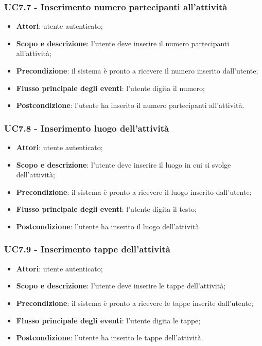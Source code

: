 \subsubsection{UC7.7 - Inserimento numero partecipanti all’attività}
\begin{itemize}
	\item \textbf{Attori}: utente autenticato;
	\item \textbf{Scopo e descrizione}: l’utente deve inserire il numero partecipanti all'attività;
	\item \textbf{Precondizione}: il sistema è pronto a ricevere il numero inserito dall’utente;
	\item \textbf{Flusso principale degli eventi}: l’utente digita il numero;
	\item \textbf{Postcondizione}: l’utente ha inserito il numero partecipanti all’attività.
\end{itemize}
\subsubsection{UC7.8 - Inserimento luogo dell’attività }
\begin{itemize}
	\item \textbf{Attori}: utente autenticato;
	\item \textbf{Scopo e descrizione}: l’utente deve inserire il luogo in cui si svolge dell'attività;
	\item \textbf{Precondizione}: il sistema è pronto a ricevere il luogo inserito dall’utente;
	\item \textbf{Flusso principale degli eventi}: l’utente digita il testo;
	\item \textbf{Postcondizione}: l’utente ha inserito il luogo dell’attività.
\end{itemize}

\subsubsection{UC7.9 - Inserimento tappe dell’attività}
\begin{itemize}
	\item \textbf{Attori}: utente autenticato;
	\item \textbf{Scopo e descrizione}: l’utente deve inserire le tappe dell'attività;
	\item \textbf{Precondizione}: il sistema è pronto a ricevere le tappe inserite dall’utente;
	\item \textbf{Flusso principale degli eventi}: l’utente digita le tappe;
	\item \textbf{Postcondizione}: l’utente ha inserito le tappe dell'attività.
\end{itemize}

